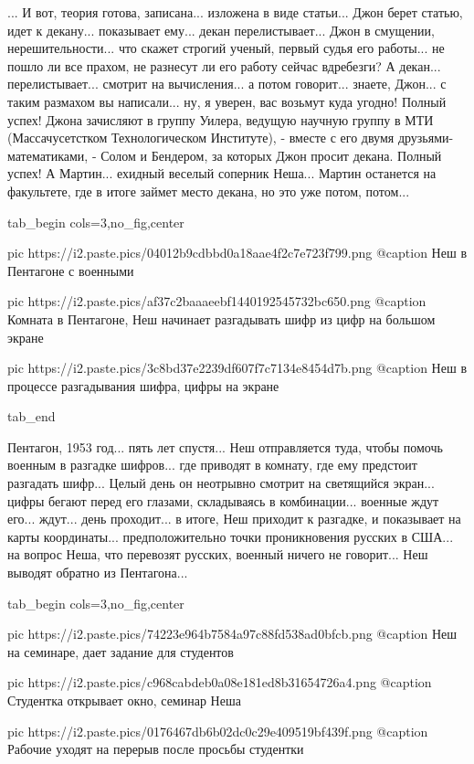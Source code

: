 ... И вот, теория готова, записана... изложена в виде статьи... Джон берет
статью, идет к декану... показывает ему... декан перелистывает... Джон в
смущении, нерешительности...  что скажет строгий ученый, первый судья его
работы... не пошло ли все прахом, не разнесут ли его работу сейчас вдребезги? А
декан... перелистывает... смотрит на вычисления...  а потом говорит... знаете,
Джон... с таким размахом вы написали... ну, я уверен, вас возьмут куда угодно!
Полный успех! Джона зачисляют в группу Уилера, ведущую научную группу в МТИ
(Массачусетстком Технологическом Институте), - вместе с его двумя
друзьями-математиками, - Солом и Бендером, за которых Джон просит декана.
Полный успех! А Мартин... ехидный веселый соперник Неша... Мартин останется на
факультете, где в итоге займет место декана, но это уже потом, потом... 

\ifcmt
  tab_begin cols=3,no_fig,center

     pic https://i2.paste.pics/04012b9cdbbd0a18aae4f2c7e723f799.png
		 @caption Неш в Пентагоне с военными

		 pic https://i2.paste.pics/af37c2baaaeebf1440192545732bc650.png
		 @caption Комната в Пентагоне, Неш начинает разгадывать шифр из цифр на большом экране

		 pic https://i2.paste.pics/3c8bd37e2239df607f7c7134e8454d7b.png
		 @caption Неш в процессе разгадывания шифра, цифры на экране

  tab_end
\fi

Пентагон, 1953 год... пять лет спустя... Неш отправляется туда, чтобы помочь
военным в разгадке шифров...  где приводят в комнату, где ему предстоит
разгадать шифр... Целый день он неотрывно смотрит на светящийся экран...  цифры
бегают перед его глазами, складываясь в комбинации... военные ждут его...
ждут... день проходит...  в итоге, Неш приходит к разгадке, и показывает на
карты координаты... предположительно точки проникновения русских в США...  на
вопрос Неша, что перевозят русских, военный ничего не говорит... Неш выводят
обратно из Пентагона...

\ifcmt
  tab_begin cols=3,no_fig,center

     pic https://i2.paste.pics/74223e964b7584a97c88fd538ad0bfcb.png
		 @caption Неш на семинаре, дает задание для студентов

		 pic https://i2.paste.pics/c968cabdeb0a08e181ed8b31654726a4.png
		 @caption Студентка открывает окно, семинар Неша

		 pic https://i2.paste.pics/0176467db6b02dc0c29e409519bf439f.png
		 @caption Рабочие уходят на перерыв после просьбы студентки

